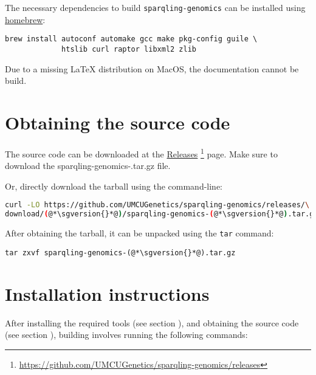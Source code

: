   The necessary dependencies to build \texttt{sparqling-genomics} can be
  installed using \href{https://brew.sh/}{homebrew}:

\begin{siderules}
\begin{verbatim}
brew install autoconf automake gcc make pkg-config guile \
             htslib curl raptor libxml2 zlib
\end{verbatim}
\end{siderules}

  Due to a missing \LaTeX{} distribution on MacOS, the documentation
  cannot be build.

\section{Obtaining the source code}
\label{sec:obtaining-tarball}

  \begin{sloppypar}
  The source code can be downloaded at the
  \href{https://github.com/UMCUGenetics/sparqling-genomics/releases}%
  {Releases}%
  \footnote{\url{https://github.com/UMCUGenetics/sparqling-genomics/releases}}
  page.  Make sure to download the {\fontfamily{\ttdefault}\selectfont
    sparqling-genomics-\sgversion{}.tar.gz} file.
  \end{sloppypar}

  Or, directly download the tarball using the command-line:
\begin{siderules}
\begin{lstlisting}[language=bash]
curl -LO https://github.com/UMCUGenetics/sparqling-genomics/releases/\
download/(@*\sgversion{}*@)/sparqling-genomics-(@*\sgversion{}*@).tar.gz
\end{lstlisting}
\end{siderules}

  After obtaining the tarball, it can be unpacked using the \texttt{tar}
  command:

\begin{siderules}
\begin{lstlisting}
tar zxvf sparqling-genomics-(@*\sgversion{}*@).tar.gz
\end{lstlisting}
\end{siderules}

\section{Installation instructions}

  After installing the required tools (see section ),
  and obtaining the source code (see section ),
  building involves running the following commands:

